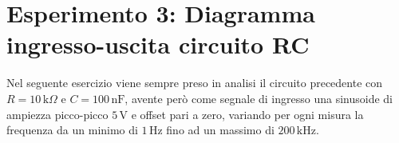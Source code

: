 
\section{Esperimento 3: Diagramma ingresso-uscita circuito RC}
Nel seguente esercizio viene sempre preso in analisi il circuito precedente con \( R = 10 \, \text{k}\Omega \) e \( C = 100 \, \text{nF} \), avente però come segnale di ingresso una sinusoide di ampiezza picco-picco \( 5 \, \text{V} \) e offset pari a zero, variando per ogni misura la frequenza da un minimo di \( 1 \, \text{Hz} \) fino ad un massimo di \( 200 \, \text{kHz} \).
\begin{table}[H]
    \centering
    \caption{Tabella dei dati di frequenza, $\Delta x$, $\Delta y$ e sfasamento in gradi.}
    \label{tab:dati_sfasamento}
\end{table}


